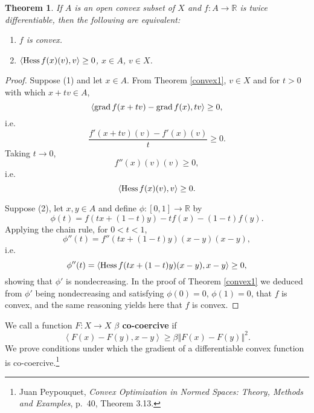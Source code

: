 \documentclass{article}
\newcommand{\inner}[2]{\left\langle #1, #2 \right\rangle}
\newcommand{\grad}{\ensuremath\mathrm{grad}\,}
\newcommand{\Hess}{\ensuremath\mathrm{Hess}\,}
\newcommand{\norm}[1]{\left\Vert #1 \right\Vert}
\newtheorem{theorem}{Theorem}
\theoremstyle{definition}
\begin{document}
\begin{theorem}
If $A$ is an open convex subset of $X$ and $f:A \to \mathbb{R}$ is twice differentiable, then the following are equivalent:
\begin{enumerate}
\item $f$ is convex.
\item $\inner{\Hess f(x)(v)}{v} \geq 0$, $x \in A$, $v \in X$. 
\end{enumerate}
\end{theorem}
\begin{proof}
Suppose (1) and let $x \in A$. From Theorem \ref{convex1}, $v \in X$ and for $t>0$ with which $x+tv \in A$,
\[
\inner{\grad f(x+tv)-\grad f(x)}{tv} \geq 0,
\]
i.e.
\[
\frac{f'(x+tv)(v)- f'(x)(v)}{t} \geq 0.
\] 
Taking $t \to 0$,
\[
f''(x)(v)(v) \geq 0,
\]
i.e.
\[
\inner{\Hess f(x)(v)}{v} \geq 0.
\]

Suppose (2), let $x,y \in A$ and define $\phi:[0,1] \to \mathbb{R}$ by
\[
\phi(t) = f(tx+(1-t)y)-tf(x)-(1-t)f(y).
\] 
Applying the chain rule, for $0<t<1$,
\[
\phi''(t) = f''(tx+(1-t)y)(x-y)(x-y),
\]
i.e.
\[
\phi''(t) = \inner{\Hess f(tx+(1-t)y)(x-y)}{x-y} \geq 0,
\]
showing that $\phi'$ is nondecreasing. 
In the proof of Theorem \ref{convex1} we deduced from $\phi'$ being nondecreasing and satisfying
$\phi(0)=0$, $\phi(1)=0$, that $f$ is convex, and the same reasoning yields here that $f$ is convex.
\end{proof}


We call a function $F:X \to X$ \textbf{$\beta$ co-coercive} if 
\[
\inner{F(x)-F(y)}{x-y} \geq \beta \norm{F(x)-F(y)}^2.
\]
We prove conditions under which the gradient of a  differentiable convex function is co-coercive.\footnote{Juan Peypouquet,
{\em Convex Optimization in Normed Spaces: Theory, Methods and Examples}, p.~40, Theorem 3.13.}
\end{document}

